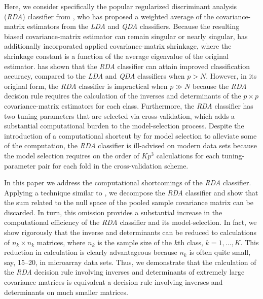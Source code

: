 \documentclass[11pt]{article}
\begin{document}
Here, we consider specifically the popular regularized discriminant analysis (\emph{RDA}) classifier from \cite{Friedman:1989tm}, who has proposed a weighted average of the covariance-matrix estimators from the \emph{LDA} and \emph{QDA} classifiers. Because the resulting biased covariance-matrix estimator can remain singular or nearly singular, \cite{Friedman:1989tm} has additionally incorporated applied covariance-matrix shrinkage, where the shrinkage constant is a function of the average eigenvalue of the original estimator. \cite{Friedman:1989tm} has shown that the \emph{RDA} classifier can attain improved classification accuracy, compared to the \emph{LDA} and \emph{QDA} classifiers when $p > N$. However, in its original form, the \emph{RDA} classifier is impractical when $p \gg N$ because the \emph{RDA} decision rule requires the calculation of the inverses and determinants of the $p \times p$ covariance-matrix estimators for each class. Furthermore, the \emph{RDA} classifier has two tuning parameters that are selected via cross-validation, which adds a substantial computational burden to the model-selection process. Despite the introduction of a computational shortcut by \cite{Friedman:1989tm} for model selection to alleviate some of the computation, the \emph{RDA} classifier is ill-advised on modern data sets because the model selection requires on the order of $Kp^3$ calculations for each tuning-parameter pair for each fold in the cross-validation scheme.

In this paper we address the computational shortcomings of the \emph{RDA} classifier. Applying a technique similar to \cite{Ye:2006tq}, we decompose the \emph{RDA} classifier and show that the sum related to the null space of the pooled sample covariance matrix can be discarded. In turn, this omission provides a substantial increase in the computational efficiency of the \emph{RDA} classifier and its model-selection. In fact, we show rigorously that the inverse and determinants can be reduced to calculations of $n_k \times n_k$ matrices, where $n_k$ is the sample size of the $k$th class, $k = 1, \ldots, K$. This reduction in calculation is clearly advantageous because $n_k$ is often quite small, say, 15--20, in microarray data sets. Thus, we demonstrate that the calculation of the \emph{RDA} decision rule involving inverses and determinants of extremely large covariance matrices is equivalent a decision rule involving inverses and determinants on much smaller matrices.
\end{document}
